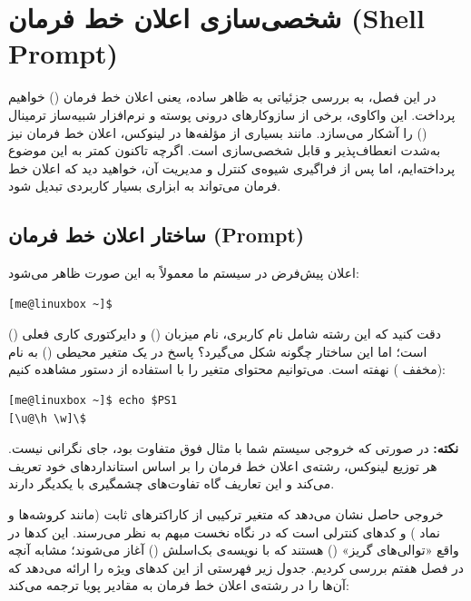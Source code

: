 \chapter{شخصی‌سازی اعلان خط فرمان (Shell Prompt)}

در این فصل، به بررسی جزئیاتی به ظاهر ساده، یعنی اعلان خط فرمان () خواهیم پرداخت. این واکاوی، برخی از سازوکارهای درونی پوسته و نرم‌افزار شبیه‌ساز ترمینال () را آشکار می‌سازد. مانند بسیاری از مؤلفه‌ها در لینوکس، اعلان خط فرمان نیز به‌شدت انعطاف‌پذیر و قابل شخصی‌سازی است. اگرچه تاکنون کمتر به این موضوع پرداخته‌ایم، اما پس از فراگیری شیوه‌ی کنترل و مدیریت آن، خواهید دید که اعلان خط فرمان می‌تواند به ابزاری بسیار کاربردی تبدیل شود.

\section{ساختار اعلان خط فرمان (Prompt)}

اعلان پیش‌فرض در سیستم ما معمولاً به این صورت ظاهر می‌شود:

\begin{latin}
\begin{lstlisting}
[me@linuxbox ~]$
\end{lstlisting}
\end{latin}

دقت کنید که این رشته شامل نام کاربری، نام میزبان () و دایرکتوری کاری فعلی () است؛ اما این ساختار چگونه شکل می‌گیرد؟ پاسخ در یک متغیر محیطی () به نام  (مخفف ) نهفته است. می‌توانیم محتوای متغیر  را با استفاده از دستور  مشاهده کنیم:

\begin{latin}
\begin{lstlisting}
[me@linuxbox ~]$ echo $PS1
[\u@\h \w]\$
\end{lstlisting}
\end{latin}

\begin{note}
\textbf{نکته:} در صورتی که خروجی سیستم شما با مثال فوق متفاوت بود، جای نگرانی نیست. هر توزیع لینوکس، رشته‌ی اعلان خط فرمان را بر اساس استانداردهای خود تعریف می‌کند و این تعاریف گاه تفاوت‌های چشمگیری با یکدیگر دارند.
\end{note}

خروجی حاصل نشان می‌دهد که متغیر  ترکیبی از کاراکترهای ثابت (مانند کروشه‌ها و نماد ) و کدهای کنترلی است که در نگاه نخست مبهم به نظر می‌رسند. این کدها در واقع «توالی‌های گریز» () هستند که با نویسه‌ی بک‌اسلش (\cmd{\textbackslash}) آغاز می‌شوند؛ مشابه آنچه در فصل هفتم بررسی کردیم. جدول زیر فهرستی از این کدهای ویژه را ارائه می‌دهد که  آن‌ها را در رشته‌ی اعلان خط فرمان به مقادیر پویا ترجمه می‌کند:

